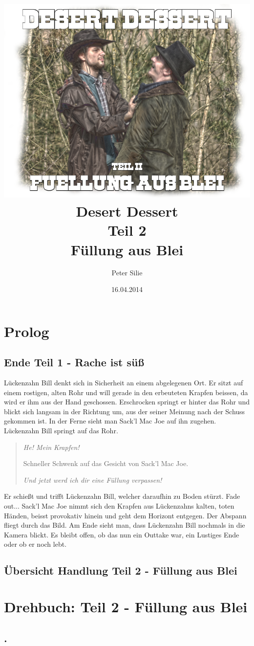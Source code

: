 \documentclass[10pt,a4paper,german]{book}
\author{Peter Silie}
\title{	\includegraphics[scale=0.5]{titelbild.png}\\
		\vspace{1cm}
		Desert Dessert\\Teil 2\\Füllung aus Blei
		}
\date{16.04.2014}
\begin{document}
\maketitle
\chapter{Prolog}
\section{Ende Teil 1 - Rache ist süß}
Lückenzahn Bill denkt sich in Sicherheit an einem abgelegenen Ort. Er sitzt auf einem rostigen, alten Rohr und will gerade in den erbeuteten Krapfen beissen, da wird er ihm aus der Hand geschossen. Erschrocken springt er hinter das Rohr und blickt sich langsam in der Richtung um, aus der seiner Meinung nach der Schuss gekommen ist. In der Ferne sieht man Sack'l Mac Joe auf ihn zugehen. Lückenzahn Bill springt auf das Rohr.

\begin{verse}
\textit{\glqq He! Mein Krapfen!\grqq}

Schneller Schwenk auf das Gesicht von Sack'l Mac Joe.

\textit{\glqq Und jetzt werd ich dir eine Füllung verpassen!\grqq}\\
\end{verse}

Er schießt und trifft Lückenzahn Bill, welcher daraufhin zu Boden stürzt. Fade out...
Sack'l Mac Joe nimmt sich den Krapfen aus Lückenzahns kalten, toten Händen, beisst provokativ hinein und geht dem Horizont entgegen.
Der Abspann fliegt durch das Bild.
Am Ende sieht man, dass Lückenzahn Bill nochmals in die Kamera blickt. Es bleibt offen, ob das nun ein Outtake war, ein Lustiges Ende oder ob er noch lebt.
\section{Übersicht Handlung Teil 2 - Füllung aus Blei}
\chapter{Drehbuch: Teil 2 - Füllung aus Blei}
\section{.}
\end{document}
